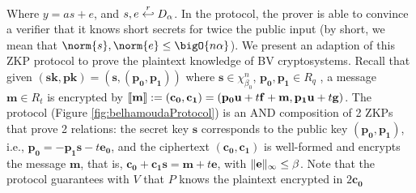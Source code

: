 Where $y = as + e$, and $s, e \stackrel{r}{\hookleftarrow} D_{\alpha}$. In the protocol, the
prover is able to convince a verifier that it knows short secrets for twice the
public input (by short, we mean that $\norm{s},\norm{e} \leq \bigO{n\alpha}$).
We present an adaption of this ZKP protocol to prove the plaintext knowledge of
BV cryptosystems. Recall that given $\mathbf{(sk,pk) = (s,(p_0,p_1))}$ where
$\mathbf{s} \in \chi_{\beta_0}^n$, $\mathbf{p_0,p_1} \in R_q$ , a message
$\mathbf{m} \in R_t$ is encrypted by
$\left\llbracket\mathbf{m}\right\rrbracket := \mathbf{(c_0, c_1)} = (\mathbf{p_0u} + t\mathbf{f + m,
  p_1u} + t\mathbf{g)}$. The protocol (Figure \ref{fig:belhamoudaProtocol}) is
an AND composition of 2 ZKPs that prove 2 relations: the secret key $\mathbf{s}$
corresponds to the public key $\mathbf{(p_0,p_1)}$, i.e.,
$\mathbf{p_0 = -p_1s} - t\mathbf{e_0}$, and the ciphertext $\mathbf{(c_0,c_1)}$
is well-formed and encrypts the message $\mathbf{m}$, that is,
$\mathbf{c_0 + c_1s} = \mathbf{m} + t\mathbf{e}$, with
$\Vert \mathbf{e} \Vert_{\infty} \leq \beta$. Note that the protocol guarantees with $V$
that $P$ knows the plaintext encrypted in $2\mathbf{c_0}$


